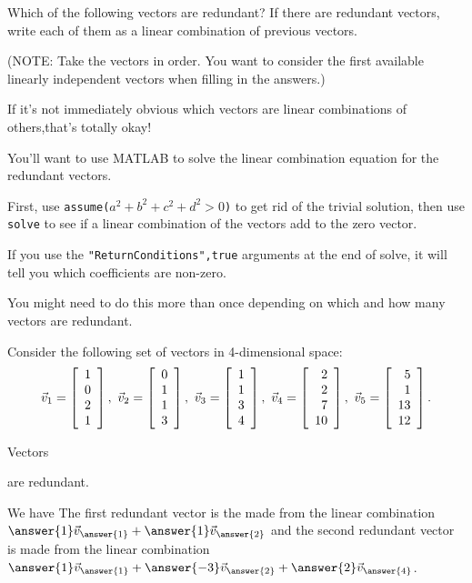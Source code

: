 \documentclass{ximera}
\author{Zack Reed}
\begin{document}
\begin{exercise}

    Which of the following vectors are redundant? If there are redundant
vectors, write each of them as a linear combination of previous
vectors.

(NOTE: Take the vectors in order. You want to consider the first available linearly independent vectors when filling in the answers.)

\begin{hint}

    If it's not immediately obvious which vectors are linear combinations of others,that's totally okay! 

    You'll want to use MATLAB to solve the linear combination equation for the redundant vectors.

    First, use \texttt{assume($a^2+b^2+c^2+d^2>0$)} to get rid of the trivial solution, then use \texttt{solve} to see if a linear combination of the vectors add to the zero vector.

    If you use the \texttt{"ReturnConditions",true} arguments at the end of solve, it will tell you which coefficients are non-zero. 

    You might need to do this more than once depending on which and how many vectors are redundant.

\end{hint}
Consider the following set of vectors in 4-dimensional space:
\[
\vect{v}_1 = \startmat{r} 1 \\ 0 \\ 2 \\ 1 \stopmat,\quad
\vect{v}_2 = \startmat{r} 0 \\ 1 \\ 1 \\ 3 \stopmat,\quad
\vect{v}_3 = \startmat{r} 1 \\ 1 \\ 3 \\ 4 \stopmat,\quad
\vect{v}_4 = \startmat{r} 2 \\ 2 \\ 7 \\ 10 \stopmat,\quad
\vect{v}_5 = \startmat{r} 5 \\ 1 \\ 13 \\ 12 \stopmat.
\]


Vectors \begin{selectAll}
\end{selectAll} are redundant.

We have
The first redundant vector is the made from the linear combination $\answer{1}\vect{v}_{\answer{1}}+\answer{1}\vect{v}_{\answer{2}}$ and the second redundant vector is made from the linear combination $\answer{1}\vect{v}_{\answer{1}}+\answer{-3}\vect{v}_{\answer{2}}+\answer{2}\vect{v}_{\answer{4}}$.


\end{exercise}
\end{document}
